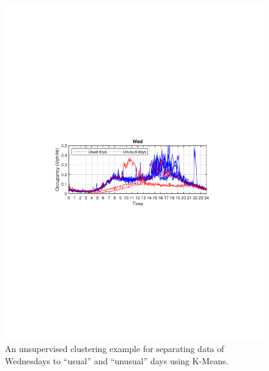 \documentclass[twocolumn,10pt]{asme2e}
\begin{document}
\begin{figure}[t]
	\centering
	\includegraphics[width=0.8\linewidth]{./Figures/clustering}
	\caption{An unsupervised clustering example for separating data of Wednesdays to ``usual'' and ``unusual'' days using K-Means.}
	\label{fig:clustering}
\end{figure}
\end{document}
